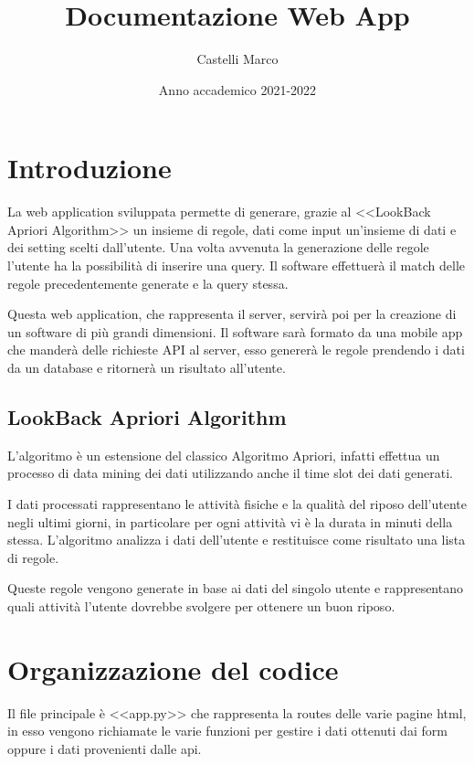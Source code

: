 \documentclass[a4paper]{article}
\title{Documentazione  Web App}
\author{Castelli Marco}
\date{Anno accademico 2021-2022}
\begin{document}
\maketitle
\newpage


\tableofcontents

\newpage

\section{Introduzione}

La web application sviluppata permette di generare, grazie al <<LookBack Apriori Algorithm>> un insieme di regole, dati come input un'insieme di dati e dei setting scelti dall'utente. Una volta avvenuta la generazione delle regole l'utente ha la possibilità di inserire una query. Il software effettuerà il match delle regole precedentemente generate e la query stessa.

Questa web application, che rappresenta il server, servirà poi per la creazione di un software di più grandi dimensioni. Il software sarà formato da una mobile app  che manderà delle richieste API al server, esso genererà le regole prendendo i dati da un database e ritornerà un risultato all'utente.

\subsection{LookBack Apriori Algorithm}
L'algoritmo è un estensione del classico Algoritmo Apriori, infatti effettua un processo di data mining dei dati utilizzando anche il time slot dei dati generati.

 I dati processati  rappresentano le attività fisiche e la qualità del riposo dell'utente negli ultimi giorni, in particolare per ogni attività vi è la durata in minuti della stessa. L'algoritmo  analizza i dati dell'utente e restituisce come risultato una lista di regole. 

Queste regole vengono generate in base ai dati del singolo utente e rappresentano quali attività l'utente dovrebbe svolgere per ottenere un buon riposo.

\section{Organizzazione del codice}
Il file principale è <<app.py>> che rappresenta la routes delle varie pagine html, in esso vengono richiamate le varie funzioni per gestire i dati ottenuti dai form oppure i dati provenienti dalle api.
\end{document}
